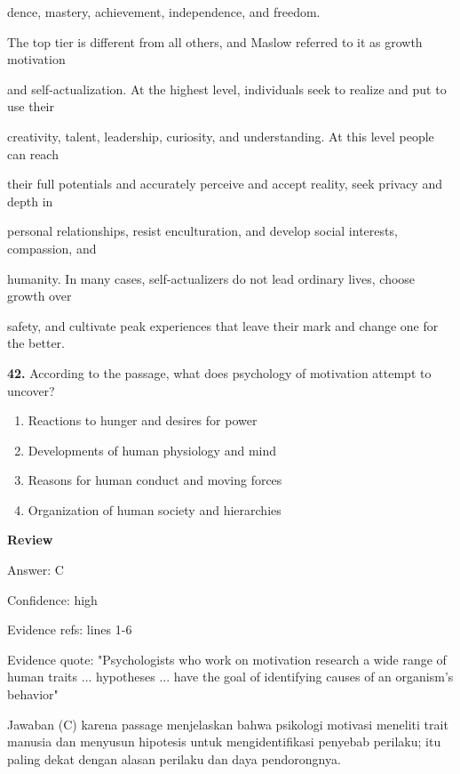 \documentclass[12pt]{article}
\begin{document}
dence, mastery, achievement, independence, and freedom.\par
The top tier is different from all others, and Maslow referred to it as growth motivation\par
and self-actualization. At the highest level, individuals seek to realize and put to use their\par
creativity, talent, leadership, curiosity, and understanding. At this level people can reach\par
their full potentials and accurately perceive and accept reality, seek privacy and depth in\par
personal relationships, resist enculturation, and develop social interests, compassion, and\par
humanity. In many cases, self-actualizers do not lead ordinary lives, choose growth over\par
safety, and cultivate peak experiences that leave their mark and change one for the better.\par
\endgroup
\medskip
\noindent\textbf{42.} According to the passage, what does psychology of motivation attempt to uncover?
\begin{enumerate}[label=(\Alph*),leftmargin=*,itemsep=0.2em]
\item Reactions to hunger and desires for power
\item Developments of human physiology and mind
\item Reasons for human conduct and moving forces
\item Organization of human society and hierarchies
\end{enumerate}
\par
\begingroup
\setlength{\parskip}{0pt}
\setlength{\parindent}{0pt}
\textbf{Review}\par
Answer: C\par
Confidence: high\par
Evidence refs: lines 1-6\par
Evidence quote: "Psychologists who work on motivation research a wide range of human traits ... hypotheses ... have the goal of identifying causes of an organism's behavior"\par
Jawaban (C) karena passage menjelaskan bahwa psikologi motivasi meneliti trait manusia dan menyusun hipotesis untuk mengidentifikasi penyebab perilaku; itu paling dekat dengan alasan perilaku dan daya pendorongnya.\par
\endgroup
\par
\vspace{0.25\baselineskip}
\end{document}
